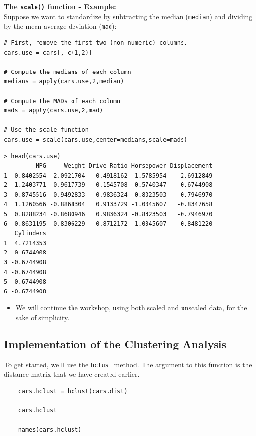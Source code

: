 \documentclass[12pt]{article}
\begin{document}
\newpage
\noindent \textbf{The \texttt{scale()} function - Example:} \\ Suppose we want to standardize by subtracting the median (\texttt{median}) and dividing by the mean average deviation (\texttt{mad}):
\begin{framed}
\begin{verbatim}
# First, remove the first two (non-numeric) columns.
cars.use = cars[,-c(1,2)]  

# Compute the medians of each column
medians = apply(cars.use,2,median)

# Compute the MADs of each column
mads = apply(cars.use,2,mad)

# Use the scale function
cars.use = scale(cars.use,center=medians,scale=mads)
\end{verbatim}
\end{framed}
\newpage
\begin{verbatim}
> head(cars.use)
         MPG     Weight Drive_Ratio Horsepower Displacement
1 -0.8402554  2.0921704  -0.4918162  1.5785954    2.6912849
2  1.2403771 -0.9617739  -0.1545708 -0.5740347   -0.6744908
3  0.8745516 -0.9492833   0.9836324 -0.8323503   -0.7946970
4  1.1260566 -0.8868304   0.9133729 -1.0045607   -0.8347658
5  0.8288234 -0.8680946   0.9836324 -0.8323503   -0.7946970
6  0.8631195 -0.8306229   0.8712172 -1.0045607   -0.8481220
   Cylinders
1  4.7214353
2 -0.6744908
3 -0.6744908
4 -0.6744908
5 -0.6744908
6 -0.6744908

\end{verbatim}
\begin{itemize} 
\item We will continue the workshop, using both scaled and unscaled data, for the sake of simplicity.
\end{itemize} 
 
\newpage

\subsection{Implementation of the Clustering Analysis}
To get started, we'll use the \texttt{hclust} method. The argument to this function is the distance matrix that we have created earlier.
\begin{framed}
	\begin{verbatim}
	cars.hclust = hclust(cars.dist)
	
	cars.hclust
	
	names(cars.hclust)
	\end{verbatim}
\end{framed}
\end{document}
